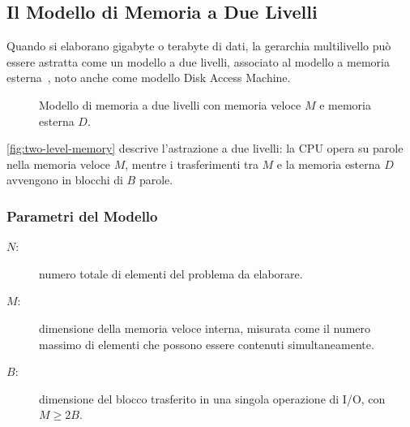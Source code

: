 \subsection{Il Modello di Memoria a Due Livelli}

Quando si elaborano gigabyte o terabyte di dati, la gerarchia multilivello può essere astratta come un modello a due livelli, associato al modello a memoria esterna~\cite{aggarwal1988}, noto anche come modello Disk Access Machine.

\begin{figure}[H]
  \centering
  \caption{Modello di memoria a due livelli con memoria veloce $M$ e memoria esterna $D$.}
  \label{fig:two-level-memory}
\end{figure}

\autoref{fig:two-level-memory} descrive l'astrazione a due livelli: la CPU opera su parole nella memoria veloce $M$, mentre i trasferimenti tra $M$ e la memoria esterna $D$ avvengono in blocchi di $B$ parole.

\subsubsection{Parametri del Modello}

\begin{description}
  \item[$N$:] numero totale di elementi del problema da elaborare.
  \item[$M$:] dimensione della memoria veloce interna, misurata come il numero massimo di elementi che possono essere contenuti simultaneamente.
  \item[$B$:] dimensione del blocco trasferito in una singola operazione di I/O, con $M \geq 2B$.
\end{description}

